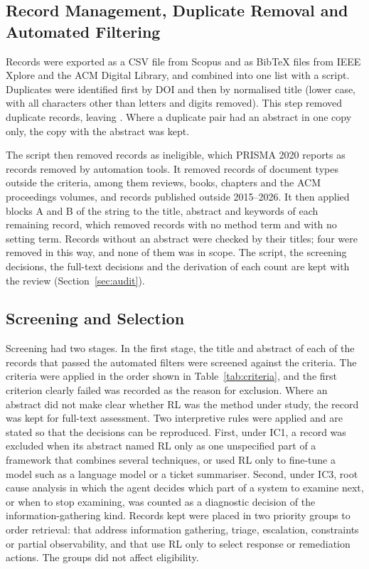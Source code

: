 \subsection{Record Management, Duplicate Removal and Automated Filtering}
\label{sec:records}

Records were exported as a CSV file from Scopus and as BibTeX files from IEEE Xplore and the ACM Digital Library, and combined into one list with a script. Duplicates were identified first by DOI and then by normalised title (lower case, with all characters other than letters and digits removed). This step removed \NDuplicates{} duplicate records, leaving \NAfterDedup. Where a duplicate pair had an abstract in one copy only, the copy with the abstract was kept.

The script then removed \NAuto{} records as ineligible, which PRISMA 2020 reports as records removed by automation tools. It removed \NAutoType{} records of document types outside the criteria, among them reviews, books, chapters and the ACM proceedings volumes, and \NAutoYear{} records published outside 2015--2026. It then applied blocks A and B of the string to the title, abstract and keywords of each remaining record, which removed \NAutoA{} records with no method term and \NAutoB{} with no setting term. Records without an abstract were checked by their titles; four were removed in this way, and none of them was in scope. The script, the screening decisions, the full-text decisions and the derivation of each count are kept with the review (Section~\ref{sec:audit}).

\subsection{Screening and Selection}
\label{sec:screening}

Screening had two stages. In the first stage, the title and abstract of each of the \NScreened{} records that passed the automated filters were screened against the criteria. The criteria were applied in the order shown in Table~\ref{tab:criteria}, and the first criterion clearly failed was recorded as the reason for exclusion. Where an abstract did not make clear whether RL was the method under study, the record was kept for full-text assessment. Two interpretive rules were applied and are stated so that the decisions can be reproduced. First, under IC1, a record was excluded when its abstract named RL only as one unspecified part of a framework that combines several techniques, or used RL only to fine-tune a model such as a language model or a ticket summariser. Second, under IC3, root cause analysis in which the agent decides which part of a system to examine next, or when to stop examining, was counted as a diagnostic decision of the information-gathering kind. Records kept were placed in two priority groups to order retrieval: \NPOne{} that address information gathering, triage, escalation, constraints or partial observability, and \NPTwo{} that use RL only to select response or remediation actions. The groups did not affect eligibility.

